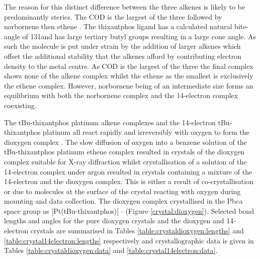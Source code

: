 The reason for this distinct difference between the three alkenes is likely to be predominantly sterics.  The COD is the largest of the three followed by norbornene then ethene .  The thixantphos ligand has a calculated natural bite-angle of 131\degrees and has large tertiary butyl groups resulting in a large cone angle.  As such the molecule is put under strain by the addition of larger alkenes which offset the additional stability that the alkenes afford by contributing electron density to the metal centre.  As COD is the largest of the three the final complex shows none of the alkene complex whilst the ethene as the smallest is exclusively the ethene complex.  However, norbornene being of an intermediate size forms an equilibrium with both the norbornene complex and the 14-electron complex coexisting.  


The tBu-thixantphos platinum alkene complexes and the 14-electron tBu-thixantphos platinum all react rapidly and irreversibly with oxygen to form the dioxygen complex .  The slow diffusion of oxygen into a benzene solution of the tBu-thixantphos platinum ethene complex resulted in crystals of the dioxygen complex suitable for X-ray diffraction whilst crystallisation of a solution of the 14-electron complex under argon resulted in crystals containing a mixture of the 14-electron and the dioxygen complex.  This is either a result of co-crystallisation or due to molecules at the surface of the crystal reacting with oxygen during mounting and data collection.  The dioxygen complex crystallised in the Pbca space group as [Pt(tBu-thixantphos)] $\cdot{}$  (Figure \ref{crystal:dioxygen}).  Selected bond lengths and angles for the pure dioxygen crystals and the dioxygen and 14-electron crystals are summarised in Tables \ref{table:crystaldioxygen:lengths} and \ref{table:crystal14electron:lengths} respectively and crystallographic data is given in Tables \ref{table:crystaldioxygen:data} and \ref{table:crystal14electron:data}.

